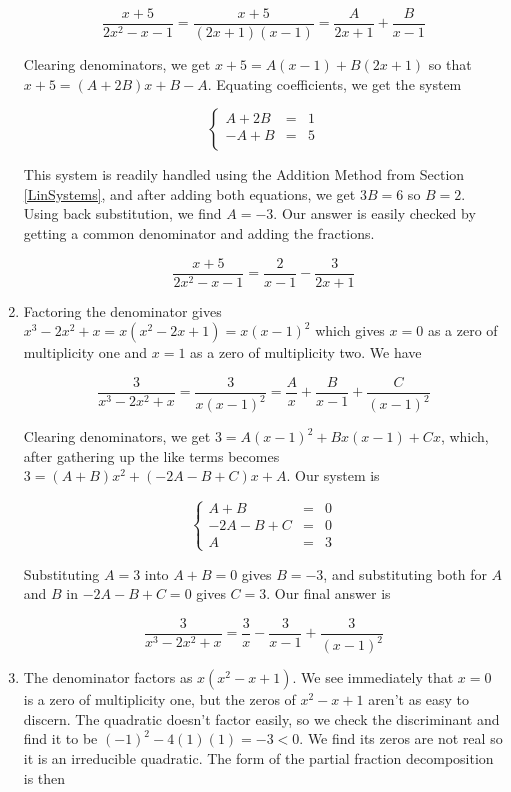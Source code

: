 \begin{ex}
\begin{enumerate}
\[\dfrac{x+5}{2x^2-x-1} = \dfrac{x+5}{(2x+1)(x-1)} = \dfrac{A}{2x+1} + \dfrac{B}{x-1}\]

Clearing denominators, we get $x+5 = A(x-1) + B(2x+1)$ so that $x + 5 = (A+2B)x + B-A$.  Equating coefficients, we get the system

\[ \left\{ \begin{array}{rcr}  A+2B & = & 1 \\ -A+B & = & 5 \\ \end{array} \right.\]

This system is readily handled using the Addition Method from Section \ref{LinSystems}, and after adding both equations, we get $3B = 6$ so $B = 2$.  Using back substitution, we find $A = -3$.  Our answer is easily checked by getting a common denominator and adding the fractions.

\[\dfrac{x+5}{2x^2-x-1} = \dfrac{2}{x-1} -\dfrac{3}{2x+1} \]

\item  Factoring the denominator gives $x^3-2x^2+x = x\left(x^2-2x+1\right) = x(x-1)^2$ which gives $x=0$ as a zero of multiplicity one and $x=1$ as a zero of multiplicity two. We have

\[ \dfrac{3}{x^3-2x^2+x} = \dfrac{3}{x(x-1)^2} = \dfrac{A}{x} + \dfrac{B}{x-1} + \dfrac{C}{(x-1)^2} \]

Clearing denominators, we get $3 = A(x-1)^2 + Bx(x-1)+Cx$, which, after gathering up the like terms becomes $3 = (A+B)x^2+(-2A-B+C)x + A$.  Our system is 
 
\[ \left\{ \begin{array}{rcr}  A+B & = & 0 \\ -2A-B+C & = & 0 \\ A & = & 3 \end{array} \right.\]

Substituting $A=3$ into $A+B = 0$ gives $B = -3$, and substituting both for $A$ and $B$ in $-2A-B+C = 0$ gives $C = 3$.  Our final answer is

\[ \dfrac{3}{x^3-2x^2+x} = \dfrac{3}{x} - \dfrac{3}{x-1} + \dfrac{3}{(x-1)^2} \]

\item  The denominator factors as $x\left(x^2-x+1\right)$.  We see immediately that $x=0$ is a zero of multiplicity one, but the zeros of $x^2-x+1$ aren't as easy to discern.  The quadratic doesn't factor easily, so we check the discriminant and find it to be $(-1)^2-4(1)(1) = -3 < 0$.  We find its zeros are not real so it is an irreducible quadratic.  The form of the partial fraction decomposition is then


\end{enumerate}
\end{ex}

